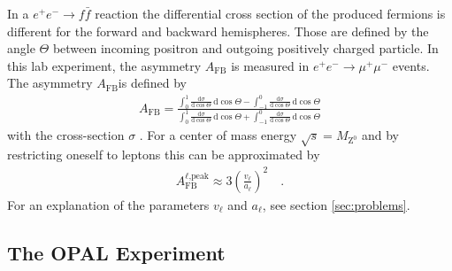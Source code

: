 \documentclass[11pt, a4paper]{article}
\numberwithin{equation}{section}
\newcommand\dinf[1]{ \,\mathrm{d}#1 }
\newcommand\deriv[2] { \frac{\mathrm{d} #1}{\mathrm{d} #2} }
\begin{document}
In a $e^+e^- \rightarrow f\bar{f}$ reaction the differential cross section of the produced fermions is different for the forward and backward hemispheres.
Those are defined by the angle $\Theta$ between incoming positron and outgoing positively charged particle.
In this lab experiment, the asymmetry $A_\mathrm{FB}$ is measured in $e^+e^- \rightarrow \mu^+\mu^-$ events. 
The asymmetry $A_\mathrm{FB}$is defined by
\begin{align*}
	A_\mathrm{FB}=\frac{\int_{0}^{1}{\deriv{\sigma}{\cos\Theta}}\dinf{\cos\Theta}-\int_{-1}^{0}{\deriv{\sigma}{\cos\Theta}}\dinf{\cos\Theta}}{\int_{0}^{1}{\deriv{\sigma}{\cos\Theta}}\dinf{\cos\Theta}+\int_{-1}^{0}{\deriv{\sigma}{\cos\Theta}}\dinf{\cos\Theta}}
\end{align*}
with the cross-section $\sigma$ \cite{instructions}.
For a center of mass energy $\sqrt{s}=M_\mathrm{Z^0}$ and by restricting oneself to leptons this can be approximated by \cite{instructions}
\begin{align*}
	A_\mathrm{FB}^{\ell\text{,peak}}\approx 3\left(\frac{v_\ell}{a_\ell}\right)^2\quad\text{.}
\end{align*}
For an explanation of the parameters $v_\ell$ and $a_\ell$, see section \ref{sec:problems}.

\subsection{The OPAL Experiment}
\end{document}
